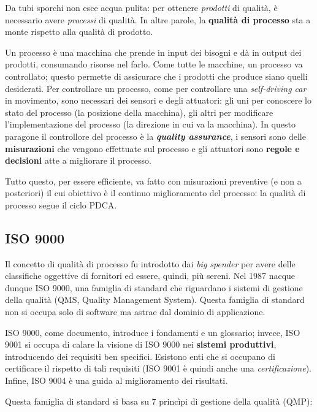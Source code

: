 \documentclass[a4paper]{article}
\begin{document}
		
Da tubi sporchi non esce acqua pulita: per ottenere \emph{prodotti} di qualità, è necessario avere \emph{processi} di qualità. In altre parole, la \textbf{qualità di processo} sta a monte rispetto alla qualità di prodotto.
		
Un processo è una macchina che prende in input dei bisogni e dà in output dei prodotti, consumando risorse nel farlo. Come tutte le macchine, un processo va controllato; questo permette di assicurare che i prodotti che produce siano quelli desiderati. Per controllare un processo, come per controllare una \emph{self-driving car} in movimento, sono necessari dei sensori e degli attuatori: gli uni per conoscere lo stato del processo (la posizione della macchina), gli altri per modificare l'implementazione del processo (la direzione in cui va la macchina). In questo paragone il controllore del processo è la \textbf{\emph{quality assurance}}, i sensori sono delle \textbf{misurazioni} che vengono effettuate sul processo e gli attuatori sono \textbf{regole e decisioni} atte a migliorare il processo.
		
Tutto questo, per essere efficiente, va fatto con misurazioni preventive (e non a posteriori) il cui obiettivo è il continuo miglioramento del processo: la qualità di processo segue il ciclo PDCA.

		
	\subsection{ISO 9000}

		
Il concetto di qualità di processo fu introdotto dai \emph{big spender} per avere delle classifiche oggettive di fornitori ed essere, quindi, più sereni. Nel 1987 nacque dunque ISO 9000, una famiglia di standard che riguardano i sistemi di gestione della qualità (QMS, Quality Management System). Questa famiglia di standard non si occupa solo di software ma astrae dal dominio di applicazione.
		
ISO 9000, come documento, introduce i fondamenti e un glossario; invece, ISO 9001 si occupa di calare la visione di ISO 9000 nei \textbf{sistemi produttivi}, introducendo dei requisiti ben specifici. Esistono enti che si occupano di certificare il rispetto di tali requisiti (ISO 9001 è quindi anche una \emph{certificazione}). Infine, ISO 9004 è una guida al miglioramento dei risultati.
		
Questa famiglia di standard si basa su 7 princìpi di gestione della qualità (QMP):
		
\end{document}
